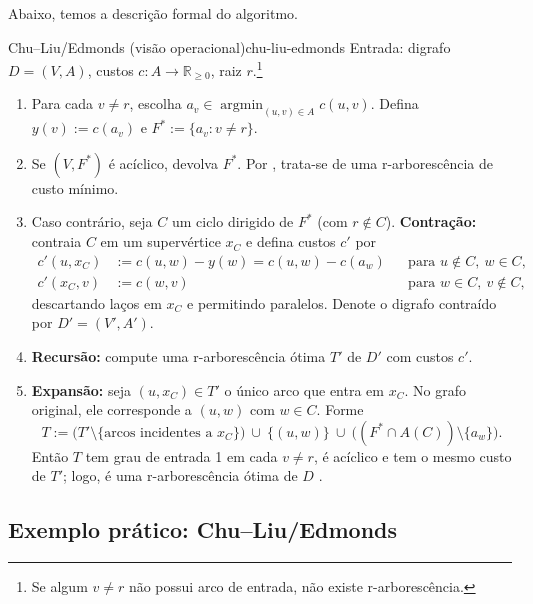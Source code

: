 Abaixo, temos a descrição formal do algoritmo.

\begin{algobox}{Chu–Liu/Edmonds (visão operacional)}{chu-liu-edmonds}
    Entrada: digrafo \(D=(V,A)\), custos \(c:A\to\mathbb{R}_{\ge 0}\), raiz \(r\).\footnote{Se algum \(v\neq r\) não possui arco de entrada, não existe r-arborescência.}
    \begin{enumerate}\setlength{\itemsep}{2pt}
        \item Para cada \(v\neq r\), escolha \(a_v\in\operatorname*{argmin}_{(u,v)\in A} c(u,v)\). Defina \(y(v):=c(a_v)\) e \(F^*:=\{a_v: v\neq r\}.\)
        \item Se \((V,F^*)\) é acíclico, devolva \(F^*\). Por \cite[Obs.~4.36]{kleinberg2006}, trata-se de uma r-arborescência de custo mínimo.
        \item Caso contrário, seja \(C\) um ciclo dirigido de \(F^*\) (com \(r\notin C\)). \textbf{Contração:} contraia \(C\) em um supervértice \(x_C\) e defina custos \(c'\) por
              \begin{align*}
                  c'(u,x_C) & := c(u,w) - y(w) = c(u,w) - c(a_w) &  & \text{para } u\notin C,\ w\in C, \\
                  c'(x_C,v) & := c(w,v)                          &  & \text{para } w\in C,\ v\notin C,
              \end{align*}
              descartando laços em \(x_C\) e permitindo paralelos. Denote o digrafo contraído por \(D'=(V',A')\).
        \item \textbf{Recursão:} compute uma r-arborescência ótima \(T'\) de \(D'\) com custos \(c'\).
        \item \textbf{Expansão:} seja \((u,x_C)\in T'\) o único arco que entra em \(x_C\). No grafo original, ele corresponde a \((u,w)\) com \(w\in C\). Forme
              \[
                  T := \bigl(T'\setminus\{\text{arcos incidentes a } x_C\}\bigr)\ \cup\ \{(u,w)\}\ \cup\ \bigl((F^*\cap A(C))\setminus\{a_w\}\bigr).
              \]
              Então \(T\) tem grau de entrada 1 em cada \(v\neq r\), é acíclico e tem o mesmo custo de \(T'\); logo, é uma r-arborescência ótima de \(D\) \cite[Sec.~4.9]{kleinberg2006,schrijver2003comb}.
    \end{enumerate}
\end{algobox}


\subsection{Exemplo prático: Chu–Liu/Edmonds}



